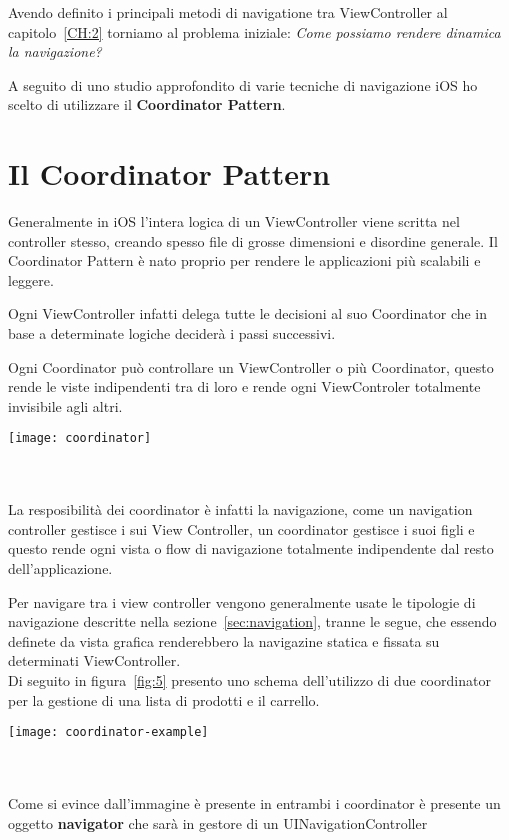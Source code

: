 

Avendo definito i principali metodi di navigatione tra ViewController al capitolo~\ref{CH:2} torniamo al problema iniziale:
\textit{Come possiamo rendere dinamica la navigazione?}

A seguito di uno studio approfondito di varie tecniche di navigazione iOS ho scelto di utilizzare il
\textbf{Coordinator Pattern}\cite{coordinatorpattern}.

\section{Il Coordinator Pattern}

Generalmente in iOS l'intera logica di un ViewController viene scritta nel controller stesso, creando spesso
file di grosse dimensioni e disordine generale. Il Coordinator Pattern è nato proprio per rendere 
le applicazioni più scalabili e leggere. 

Ogni ViewController infatti delega tutte le decisioni al suo Coordinator che in base a determinate logiche deciderà
i passi successivi.

Ogni Coordinator può controllare un ViewController o più Coordinator, questo rende le viste
indipendenti tra di loro e rende ogni ViewControler totalmente invisibile agli altri.\\

\begin{minipage}{\linewidth}
    \centering
    \texttt{[image: coordinator]}
    \label{fig:4}
\end{minipage}\\ \\

La resposibilità dei coordinator è infatti la navigazione, come un navigation controller gestisce i sui View Controller, un coordinator gestisce
i suoi figli e questo rende ogni vista o flow di navigazione totalmente indipendente dal resto dell'applicazione.

Per navigare tra i view controller vengono generalmente usate le tipologie di navigazione
descritte nella sezione~\ref{sec:navigation}, tranne le segue, che essendo definete da vista grafica renderebbero
la navigazine statica e fissata su determinati ViewController. \\

Di seguito in figura~\ref{fig:5} presento uno schema dell'utilizzo di due coordinator
per la gestione di una lista di prodotti e il carrello. \\

\begin{minipage}{\linewidth}
    \centering
    \texttt{[image: coordinator-example]}
    \label{fig:5}
\end{minipage}\\ \\

Come si evince dall'immagine è presente in entrambi i coordinator è presente un oggetto
\textbf{navigator} che sarà in gestore di un UINavigationController
